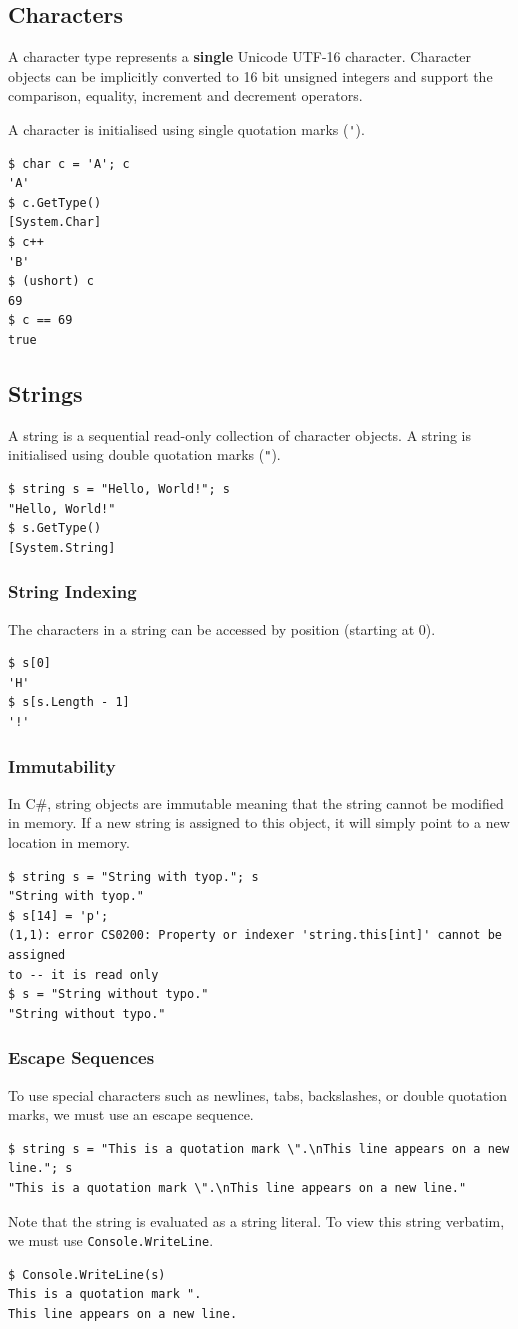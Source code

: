 \documentclass{article}
\begin{document}
\subsection{Characters}
A character type represents a \textbf{single} Unicode UTF-16 character.
Character objects can be implicitly converted to 16 bit unsigned integers and
support the comparison, equality, increment and \linebreak decrement operators.

A character is initialised using single quotation marks (\lstinline!'!). %
\begin{lstlisting}
$ char c = 'A'; c
'A'
$ c.GetType()
[System.Char]
$ c++
'B'
$ (ushort) c
69
$ c == 69
true
\end{lstlisting}
\subsection{Strings}
A string is a sequential read-only collection of character objects.
A string is initialised using double quotation marks (\lstinline!"!). %
\begin{lstlisting}
$ string s = "Hello, World!"; s
"Hello, World!"
$ s.GetType()
[System.String]
\end{lstlisting}
\subsubsection{String Indexing}
The characters in a string can be accessed by position (starting at 0).
\begin{lstlisting}
$ s[0]
'H'
$ s[s.Length - 1]
'!'
\end{lstlisting}
\subsubsection{Immutability}
In C\#, string objects are immutable meaning that the string cannot be modified in memory. If a new string is assigned
to this object, it will simply point to a new location in memory.
\begin{lstlisting}
$ string s = "String with tyop."; s
"String with tyop."
$ s[14] = 'p';
(1,1): error CS0200: Property or indexer 'string.this[int]' cannot be assigned 
to -- it is read only
$ s = "String without typo."
"String without typo."
\end{lstlisting}
\subsubsection{Escape Sequences}
To use special characters such as newlines, tabs, backslashes, or double quotation marks, we must
use an escape sequence.
\begin{lstlisting}
$ string s = "This is a quotation mark \".\nThis line appears on a new line."; s
"This is a quotation mark \".\nThis line appears on a new line."
\end{lstlisting}
Note that the string is evaluated as a string literal. To view this string verbatim, we must use
\lstinline!Console.WriteLine!.
\begin{lstlisting}
$ Console.WriteLine(s) 
This is a quotation mark ".
This line appears on a new line.
\end{lstlisting}
\end{document}
